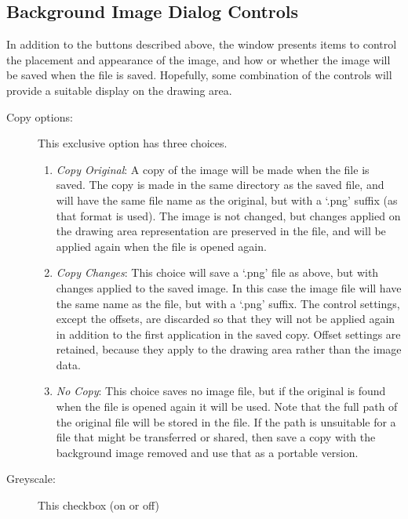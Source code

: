 		\subsection{Background Image Dialog Controls}%
		\label{ssec:bg_image_controls}
		In addition to the buttons described above,
		the   window
		presents items to control the placement and
		appearance of the image, and how or whether
		the image will be saved when the \IXpkg{} file
		is saved. Hopefully, some combination of the
		controls will provide a suitable display on the
		drawing area.

		\begin{description}
		  \item[Copy options:] This exclusive option
		  has three choices.
			\begin{enumerate}
			  \item \emph{Copy Original}: A
			  copy of the image will be made when the
			  \IXpkg{} file is saved. The copy is made in
			  the same directory as the saved \IXpkg{} file,
			  and will have the same file name as the original,
			  but with a
			  `.png' suffix (as that format is used).  The
			  image is not changed, but changes applied on the
			  drawing area representation are preserved in
			  the \IXpkg{} file, and will be applied again when
			  the \IXpkg{} file is opened again.
			  \item \emph{Copy Changes}: This
			  choice will save a `.png'
			  file as above, but with changes applied to
			  the saved image. In this case the image
			  file will have the same name as the \IXpkg{} file,
			  but with a `.png' suffix. The 
			  control settings, except the offsets,
			  are discarded so that they will not be applied
			  again in addition to the first application
			  in the saved copy. Offset settings are retained,
			  because they apply to the drawing area rather
			  than the image data.
			  \item \emph{No Copy}: This choice
			  saves no image file, but if the
			  original is found when the \IXpkg{} file is
			  opened again it will be used. Note that the
			  full path of the original file will be stored
			  in the \IXpkg{} file. If the path is unsuitable
			  for a file that might be transferred or shared,
			  then save a copy with the background image
			  removed and use that as a portable version.
			\end{enumerate}
		  \item[Greyscale:] This checkbox (on or off)

\end{description}
